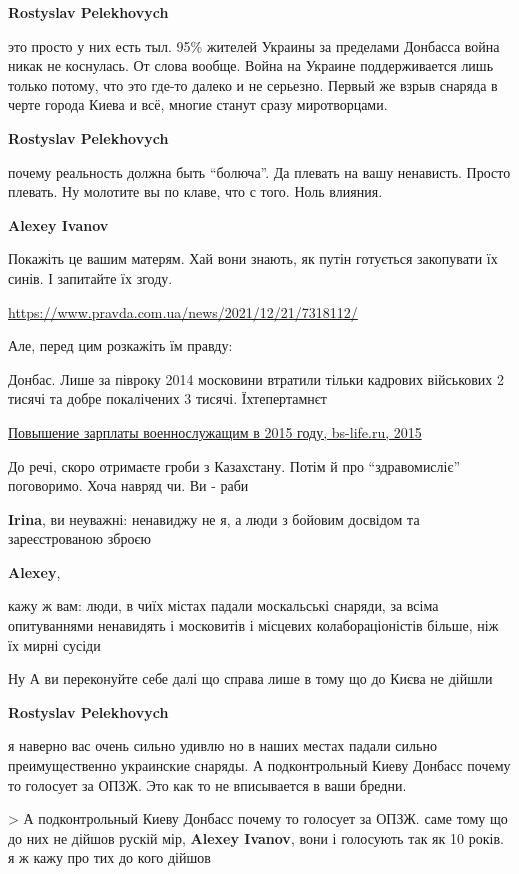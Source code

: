 \begin{itemize}
\begin{itemize}
\textbf{Rostyslav Pelekhovych} 

это просто у них есть тыл. 95\% жителей Украины за пределами Донбасса война
никак не коснулась. От слова вообще. Война на Украине поддерживается лишь
только потому, что это где-то далеко и не серьезно. Первый же взрыв снаряда в
черте города Киева и всё, многие станут сразу миротворцами.

\textbf{Rostyslav Pelekhovych} 

почему реальность должна быть \enquote{болюча}. Да плевать на вашу ненависть. Просто
плевать. Ну молотите вы по клаве, что с того. Ноль влияния.

\textbf{Alexey Ivanov} 

Покажіть це вашим матерям. Хай вони знають, як путін готується закопувати їх
синів. І запитайте їх згоду.

\url{https://www.pravda.com.ua/news/2021/12/21/7318112/}

Але, перед цим розкажіть їм правду:

Донбас. Лише за півроку 2014 московини втратили тільки кадрових військових 2
тисячі та добре покалічених 3 тисячі. Їхтепертамнєт

\href{https://web.archive.org/web/20150315011807/http://bs-life.ru/rabota/zarplata/voennosluzashchie2015.html}{%
Повышение зарплаты военнослужащим в 2015 году, bs-life.ru, 2015}

До речі, скоро отримаєте гроби з Казахстану. Потім й про \enquote{здравомисліє}
поговоримо. Хоча навряд чи. Ви - раби

\textbf{Irina}, ви неуважні: ненавиджу не я, а люди з бойовим досвідом та зареєстрованою зброєю

\textbf{Alexey}, 

кажу ж вам: люди, в чиїх містах падали москальські снаряди, за всіма
опитуваннями ненавидять і московитів і місцевих колабораціоністів більше, ніж
їх мирні сусіди

Ну А ви переконуйте себе далі що справа лише в тому що до Києва не дійшли

\textbf{Rostyslav Pelekhovych} 

я наверно вас очень сильно удивлю но в наших местах падали сильно
преимущественно украинские снаряды. А подконтрольный Киеву Донбасс почему то
голосует за ОПЗЖ. Это как то не вписывается в ваши бредни.

> А подконтрольный Киеву Донбасс почему то голосует за ОПЗЖ.
саме тому що до них не дійшов рускій мір, \textbf{Alexey Ivanov}, вони і голосують так як 10 років. я ж кажу про тих до кого дійшов


\end{itemize}
\end{itemize}
